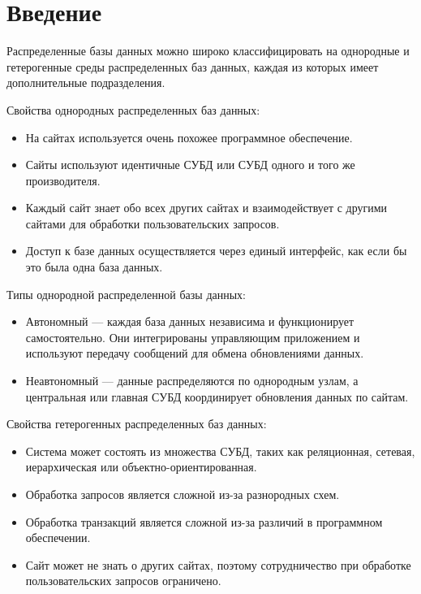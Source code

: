 \section*{\LARGE Введение}

Распределенные базы данных можно широко классифицировать на
однородные и гетерогенные среды распределенных баз данных, каждая из
которых имеет дополнительные подразделения.

Свойства однородных распределенных баз данных:
\begin{itemize}
	\item На сайтах используется очень похожее программное обеспечение.
	\item Сайты используют идентичные СУБД или СУБД одного и того же
		производителя.
	\item Каждый сайт знает обо всех других сайтах и взаимодействует с
		другими сайтами для обработки пользовательских запросов.
	\item Доступ к базе данных осуществляется через единый интерфейс, как
		если бы это была одна база данных.
\end{itemize}

Типы однородной распределенной базы данных:
\begin{itemize}
	\item Автономный — каждая база данных независима и функционирует
		самостоятельно. Они интегрированы управляющим приложением и
		используют передачу сообщений для обмена обновлениями данных.
	\item Неавтономный — данные распределяются по однородным узлам, а
		центральная или главная СУБД координирует обновления данных по
		сайтам.
\end{itemize}

Свойства гетерогенных распределенных баз данных:
\begin{itemize}
	\item Система может состоять из множества СУБД, таких как реляционная,
		сетевая, иерархическая или объектно-ориентированная.
	\item Обработка запросов является сложной из-за разнородных схем.
	\item Обработка транзакций является сложной из-за различий в
		программном обеспечении.
	\item Сайт может не знать о других сайтах, поэтому сотрудничество при
		обработке пользовательских запросов ограничено.
\end{itemize}

